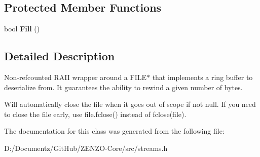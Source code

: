 \subsection*{Protected Member Functions}
\begin{DoxyCompactItemize}
\item 
\mbox{\label{class_c_buffered_file_a2c93fc60c4460bd1ccf90922646b19b8}} 
bool {\bfseries Fill} ()
\end{DoxyCompactItemize}


\subsection{Detailed Description}
Non-\/refcounted R\+A\+II wrapper around a F\+I\+L\+E$\ast$ that implements a ring buffer to deserialize from. It guarantees the ability to rewind a given number of bytes.

Will automatically close the file when it goes out of scope if not null. If you need to close the file early, use file.\+fclose() instead of fclose(file). 

The documentation for this class was generated from the following file\+:\begin{DoxyCompactItemize}
\item 
D\+:/\+Documentz/\+Git\+Hub/\+Z\+E\+N\+Z\+O-\/\+Core/src/streams.\+h\end{DoxyCompactItemize}
